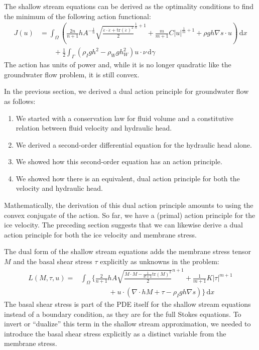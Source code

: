 \documentclass{article}
\theoremstyle{definition}
\theoremstyle{plain}
\newcommand{\ud}{\hspace{2pt}\mathrm{d}}
\begin{document}
The shallow stream equations can be derived as the optimality conditions to find the minimum of the following action functional:
\begin{align}
    J(u) & = \int_\Omega\left(\frac{2n}{n + 1}hA^{-\frac{1}{n}}\sqrt{\frac{\dot\varepsilon\cdot\dot\varepsilon + \text{tr}(\dot\varepsilon)^2}{2}}^{\frac{1}{n} + 1} + \frac{m}{m + 1}C|u|^{\frac{1}{m} + 1} + \rho gh\nabla s\cdot u\right)\ud x  \nonumber \\
    & \qquad + \frac{1}{2}\int_\Gamma\left(\rho_Igh^2 - \rho_Wgh_W^2\right)u\cdot\nu\ud\gamma
    \label{eq:ssa-primal-action}
\end{align}
The action has units of power and, while it is no longer quadratic like the groundwater flow problem, it is still convex.

In the previous section, we derived a dual action principle for groundwater flow as follows:
\begin{enumerate}
    \item We started with a conservation law for fluid volume and a constitutive relation between fluid velocity and hydraulic head.
    \item We derived a second-order differential equation for the hydraulic head alone.
    \item We showed how this second-order equation has an action principle.
    \item We showed how there is an equivalent, dual action principle for both the velocity and hydraulic head.
\end{enumerate}
Mathematically, the derivation of this dual action principle amounts to using the convex conjugate of the action.
So far, we have a (primal) action principle for the ice velocity.
The preceding section suggests that we can likewise derive a dual action principle for both the ice velocity and membrane stress.

The dual form of the shallow stream equations adds the membrane stress tensor $M$ and the basal shear stress $\tau$ explicitly as unknowns in the problem:
\begin{align}
    L(M, \tau, u) = & \int_\Omega\Bigg\{\frac{2}{n + 1}hA\sqrt{\frac{M\cdot M - \frac{1}{d + 1}\text{tr}(M)^2}{2}}^{n + 1} + \frac{1}{m + 1}K|\tau|^{m + 1} \nonumber\\
    & \qquad\qquad + u\cdot\left(\nabla\cdot hM + \tau - \rho_Igh\nabla s\right)\Bigg\}\ud x
\end{align}
The basal shear stress is part of the PDE itself for the shallow stream equations instead of a boundary condition, as they are for the full Stokes equations.
To invert or ``dualize'' this term in the shallow stream approximation, we needed to introduce the basal shear stress explicitly as a distinct variable from the membrane stress.
\end{document}
